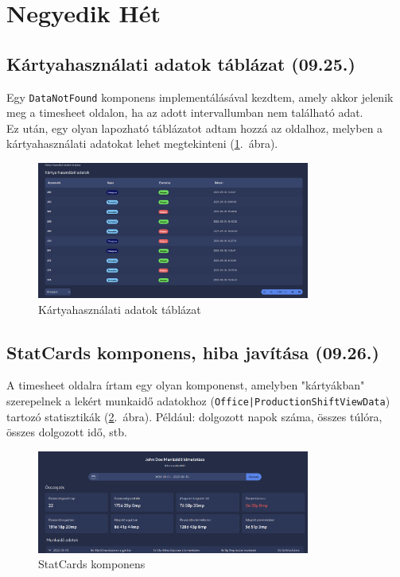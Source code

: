 \documentclass[a4paper]{article}
\newcommand{\inlts}[1]{\texttt{#1}}
\newcommand{\inltxt}[1]{\texttt{#1}}
\begin{document}
\section{Negyedik Hét}

\subsection{Kártyahasználati adatok táblázat (09.25.)}

Egy \inlts{DataNotFound} komponens implementálásával kezdtem, amely akkor jelenik meg a timesheet
oldalon, ha az adott intervallumban nem található adat.\\

Ez után, egy olyan lapozható táblázatot adtam hozzá az oldalhoz, melyben a kártyahasználati adatokat
lehet megtekinteni (\ref{fig:card_usages_table}.~ábra).

\begin{figure}[ht]
  \centering
  \includegraphics[width = 0.8\textwidth]{images/card_usages_table.png}
  \caption{Kártyahasználati adatok táblázat}
  \label{fig:card_usages_table}
\end{figure}

\subsection{StatCards komponens, hiba javítása (09.26.)}

A timesheet oldalra írtam egy olyan komponenst, amelyben "kártyákban" szerepelnek a lekért
munkaidő adatokhoz (\inltxt{Office|ProductionShiftViewData}) tartozó statisztikák (\ref{fig:stat_cards}.~ábra). Például:
dolgozott napok száma, összes túlóra, összes dolgozott idő, stb.\\

\begin{figure}[ht]
  \centering
  \includegraphics[width = 0.8\textwidth]{images/stat_cards.png}
  \caption{StatCards komponens}
  \label{fig:stat_cards}
\end{figure}
\end{document}

